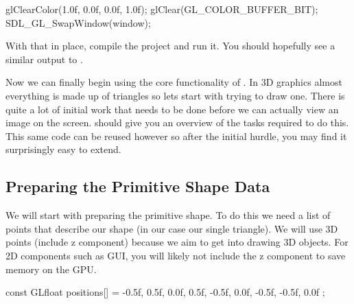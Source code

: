 \documentclass[10pt]{article}
\begin{document}
\begin{Listing}

  glClearColor(1.0f, 0.0f, 0.0f, 1.0f);
  glClear(GL_COLOR_BUFFER_BIT);
  SDL_GL_SwapWindow(window);

\end{Listing}


With that in place, compile the project and run it. You should hopefully
see a similar output to .


Now we can finally begin using the core functionality of . In
3D graphics almost everything is made up of triangles so lets start with
trying to draw one. There is quite a lot of initial work that needs to be
done before we can actually view an image on the screen. 
should give you an overview of the tasks required to do this. This same
code can be reused however so after the initial hurdle, you may find it
surprisingly easy to extend.


\subsection*{Preparing the Primitive Shape Data}
We will start with preparing the primitive shape. To do this we need a
list of points that describe our shape (in our case our single triangle).
We will use 3D points (include z component) because we aim to get into
drawing 3D objects. For 2D components such as GUI, you will likely not
include the z component to save memory on the GPU.

\begin{Listing}

  const GLfloat positions[] = {
    -0.5f, 0.5f, 0.0f,
    0.5f, -0.5f, 0.0f,
    -0.5f, -0.5f, 0.0f
  };

\end{Listing}
\end{document}
